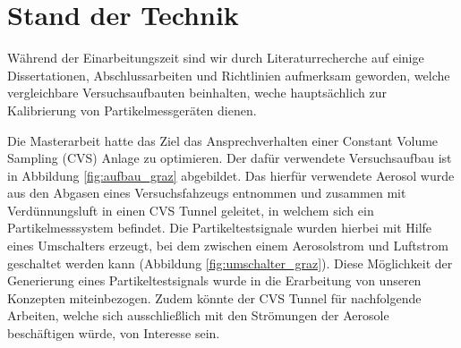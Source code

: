 \section{Stand der Technik}
W\"{a}hrend der Einarbeitungszeit sind wir durch Literaturrecherche auf einige Dissertationen, Abschlussarbeiten und Richtlinien aufmerksam geworden, welche vergleichbare Versuchsaufbauten beinhalten, weche haupts\"{a}chlich zur Kalibrierung von Partikelmessger\"{a}ten dienen.

Die Masterarbeit \cite{auswertemethodik} hatte das Ziel das Ansprechverhalten einer Constant Volume Sampling (CVS) Anlage zu optimieren. Der daf\"{u}r verwendete Versuchsaufbau ist in Abbildung \ref{fig:aufbau_graz} abgebildet. Das hierf\"{u}r verwendete Aerosol wurde aus den Abgasen eines Versuchsfahzeugs entnommen und zusammen mit Verd\"{u}nnungsluft in einen CVS Tunnel geleitet, in welchem sich ein Partikelmesssystem befindet. Die Partikeltestsignale wurden hierbei mit Hilfe eines Umschalters erzeugt, bei dem zwischen einem Aerosolstrom und Luftstrom geschaltet werden kann (Abbildung \ref{fig:umschalter_graz}). Diese M\"{o}glichkeit der Generierung eines Partikeltestsignals wurde in die Erarbeitung von unseren Konzepten miteinbezogen. Zudem k\"{o}nnte der CVS Tunnel f\"{u}r nachfolgende Arbeiten, welche sich ausschlie{\ss}lich mit den Str\"{o}mungen der Aerosole besch\"{a}ftigen w\"{u}rde, von Interesse sein.


